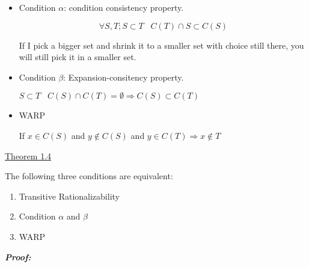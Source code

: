 \documentclass{article}
\begin{document}
\begin{itemize}

\item 
Condition $\alpha$: condition consistency property.

\[
\forall S,T; S\subset T \;\;\;C(T) \cap S \subset C(S)
\]

If I pick a bigger set and shrink it to a smaller set with choice still there, you will still pick it in a smaller set.

\item 
Condition $\beta$: Expansion-consitency property.

$S \subset T  \;\;\; C(S)\cap C(T) = \emptyset \Rightarrow C(S) \subset C(T) $


\item WARP

If $x\in C(S)$ and $y \not \in C(S)$ and $y \in C(T) \Rightarrow x \not \in T$ 

\end{itemize}


\underline{Theorem 1.4}

The following three conditions are equivalent:

\begin{enumerate}

\item Transitive Rationalizability
\item Condition $\alpha$ and $\beta$
\item WARP
\end{enumerate}

\textbf{\emph{Proof:}}
\end{document}
